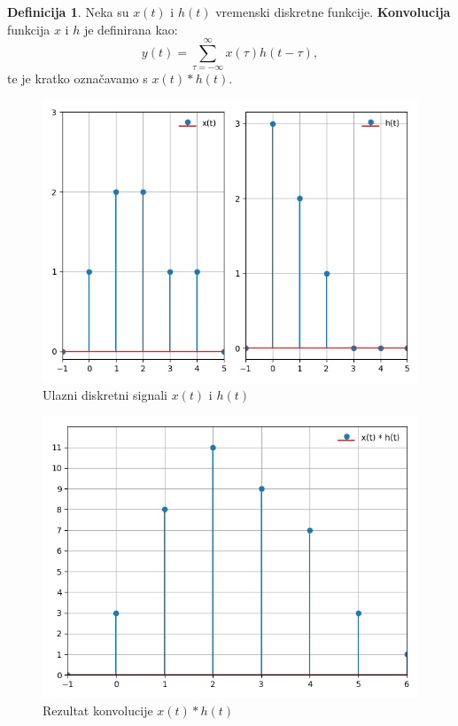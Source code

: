 \documentclass[times, utf8, diplomski]{fer}
\theoremstyle{definition}
\newtheorem{definition}{Definicija}[section]
\begin{document}
\theoremstyle{definition}
\begin{definition}
Neka su $x(t)$ i $h(t)$ vremenski diskretne funkcije. \textbf{Konvolucija} funkcija $x$ i $h$ je definirana kao:
\begin{equation}
y(t) = \sum_{\tau=-\infty}^{\infty}x(\tau)h(t-\tau),
\end{equation}
te je kratko označavamo s $x(t) * h(t)$.
\end{definition}

\begin{figure}[h]
\centering
\includegraphics[scale=0.5]{convolution_discrete.png}
\caption{Ulazni diskretni signali $x(t)$ i $h(t)$}
\end{figure}



\begin{figure}[h]
\centering
\includegraphics[scale=0.5]{convolution_result.png}
\caption{Rezultat konvolucije $x(t) * h(t)$}
\end{figure}
\end{document}
